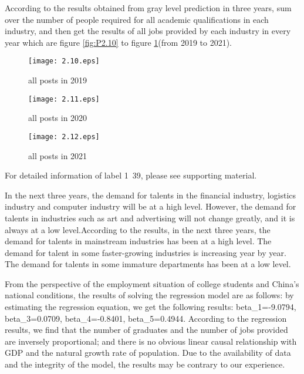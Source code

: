 \documentclass{mcmthesis}
\begin{document}
\par\noindent
According to the results obtained from gray level prediction in three years, sum over the number of people required for all academic qualifications in each industry, and then get the results of all jobs provided by each industry in every year which are figure \ref{fig:P2.10} to figure \ref{fig:P2.12}(from 2019 to 2021).
\begin{figure}[h]
	\begin{minipage}[h]{0.31\linewidth}
		\centering
		\texttt{[image: 2.10.eps]}
		\caption{all posts in 2019}
		\label{fig:P2.10}
	\end{minipage}
	\begin{minipage}[h]{0.31\linewidth}
		\centering
		\texttt{[image: 2.11.eps]}
		\caption{all posts in 2020}
		\label{fig:P2.11}
	\end{minipage}
	\begin{minipage}[h]{0.31\linewidth}
		\centering
		\texttt{[image: 2.12.eps]}
		\caption{all posts in 2021}
		\label{fig:P2.12}
	\end{minipage}
\end{figure}
For detailed information of label 1~39, please see supporting material.
\par\noindent
In the next three years, the demand for talents in the financial industry, logistics industry and computer industry will be at a high level. However, the demand for talents in industries such as art and advertising will not change greatly, and it is always at a low level.According to the results, in the next three years, the demand for talents in mainstream industries has been at a high level. The demand for talent in some faster-growing industries is increasing year by year. The demand for talents in some immature departments has been at a low level.
\par\noindent
From the perspective of the employment situation of college students and China's national conditions, the results of solving the regression model are as follows: by estimating the regression equation, we get the following results: beta\_1=-9.0794, beta\_3=0.0709, beta\_4=-0.8401, beta\_5=0.4944. According to the regression results, we find that the number of graduates and the number of jobs provided are inversely proportional; and there is no obvious linear causal relationship with GDP and the natural growth rate of population. Due to the availability of data and the integrity of the model, the results may be contrary to our experience.
\end{document}
